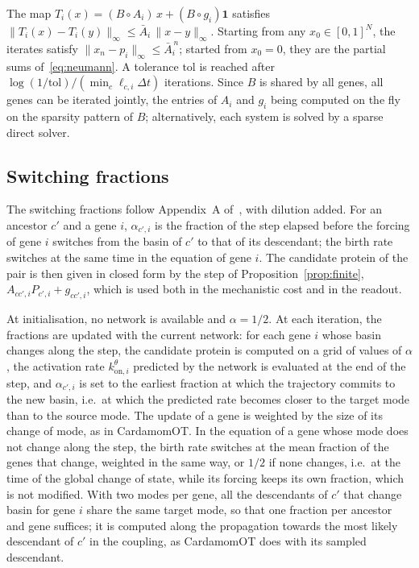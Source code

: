 \documentclass[a4paper, 11pt]{article}
\newcommand{\koni}{k_{\mathrm{on},i}^{\theta}}
\theoremstyle{plain}
\theoremstyle{remark}
\begin{document}
The map $T_i(x) = (B\circ A_i)\,x + (B\circ g_i)\mathbf{1}$ satisfies $\|T_i(x) - T_i(y)\|_\infty \leq \bar A_i\,\|x - y\|_\infty$. Starting from any $x_0 \in [0,1]^N$, the iterates satisfy $\|x_n - p_i\|_\infty \leq \bar A_i^{\,n}$; started from $x_0 = 0$, they are the partial sums of~\eqref{eq:neumann}. A tolerance $\mathrm{tol}$ is reached after $\log(1/\mathrm{tol})/(\min_c \ell_{c,i}\Delta t)$ iterations. Since $B$ is shared by all genes, all genes can be iterated jointly, the entries of $A_i$ and $g_i$ being computed on the fly on the sparsity pattern of $B$; alternatively, each system is solved by a sparse direct solver.

\subsection{Switching fractions}\label{sup:switch}

The switching fractions follow Appendix~A of~\cite{mauge2026cardamomot}, with dilution added. For an ancestor $c'$ and a gene $i$, $\alpha_{c',i}$ is the fraction of the step elapsed before the forcing of gene $i$ switches from the basin of $c'$ to that of its descendant; the birth rate switches at the same time in the equation of gene $i$. The candidate protein of the pair is then given in closed form by the step of Proposition~\ref{prop:finite}, $A_{cc',i}P_{c',i} + g_{cc',i}$, which is used both in the mechanistic cost and in the readout.

At initialisation, no network is available and $\alpha = 1/2$. At each iteration, the fractions are updated with the current network: for each gene $i$ whose basin changes along the step, the candidate protein is computed on a grid of values of $\alpha$, the activation rate $\koni$ predicted by the network is evaluated at the end of the step, and $\alpha_{c',i}$ is set to the earliest fraction at which the trajectory commits to the new basin, i.e.\ at which the predicted rate becomes closer to the target mode than to the source mode. The update of a gene is weighted by the size of its change of mode, as in CardamomOT. In the equation of a gene whose mode does not change along the step, the birth rate switches at the mean fraction of the genes that change, weighted in the same way, or $1/2$ if none changes, i.e.\ at the time of the global change of state, while its forcing keeps its own fraction, which is not modified. With two modes per gene, all the descendants of $c'$ that change basin for gene $i$ share the same target mode, so that one fraction per ancestor and gene suffices; it is computed along the propagation towards the most likely descendant of $c'$ in the coupling, as CardamomOT does with its sampled descendant. 
\end{document}
